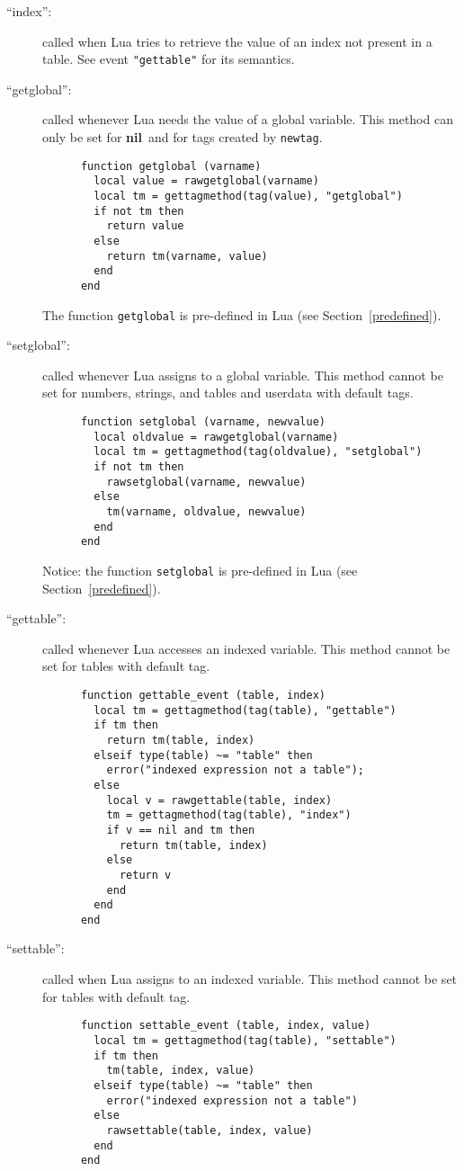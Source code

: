 \documentclass[11pt]{article}
\newcommand{\See}[1]{Section~\ref{#1}}
\newcommand{\see}[1]{(see \See{#1})}
\newcommand{\nil}{{\bf nil}}
\begin{document}
\begin{description}
\item[``index'':]
called when Lua tries to retrieve the value of an index
not present in a table.
See event \verb|"gettable"| for its semantics.

\item[``getglobal'':]
called whenever Lua needs the value of a global variable.
This method can only be set for \nil\ and for tags
created by \verb|newtag|.
\begin{verbatim}
      function getglobal (varname)
        local value = rawgetglobal(varname)
        local tm = gettagmethod(tag(value), "getglobal")
        if not tm then
          return value
        else
          return tm(varname, value)
        end
      end
\end{verbatim}
The function \verb|getglobal| is pre-defined in Lua \see{predefined}.

\item[``setglobal'':]
called whenever Lua assigns to a global variable.
This method cannot be set for numbers, strings, and tables and
userdata with default tags.
\begin{verbatim}
      function setglobal (varname, newvalue)
        local oldvalue = rawgetglobal(varname)
        local tm = gettagmethod(tag(oldvalue), "setglobal")
        if not tm then
          rawsetglobal(varname, newvalue)
        else
          tm(varname, oldvalue, newvalue)
        end
      end
\end{verbatim}
Notice: the function \verb|setglobal| is pre-defined in Lua \see{predefined}.

\item[``gettable'':]
called whenever Lua accesses an indexed variable.
This method cannot be set for tables with default tag.
\begin{verbatim}
      function gettable_event (table, index)
        local tm = gettagmethod(tag(table), "gettable")
        if tm then
          return tm(table, index)
        elseif type(table) ~= "table" then
          error("indexed expression not a table");
        else
          local v = rawgettable(table, index)
          tm = gettagmethod(tag(table), "index")
          if v == nil and tm then
            return tm(table, index)
          else
            return v
          end
        end
      end
\end{verbatim}

\item[``settable'':]
called when Lua assigns to an indexed variable.
This method cannot be set for tables with default tag.
\begin{verbatim}
      function settable_event (table, index, value)
        local tm = gettagmethod(tag(table), "settable")
        if tm then
          tm(table, index, value)
        elseif type(table) ~= "table" then
          error("indexed expression not a table")
        else
          rawsettable(table, index, value)
        end
      end
\end{verbatim}


\end{description}
\end{document}
